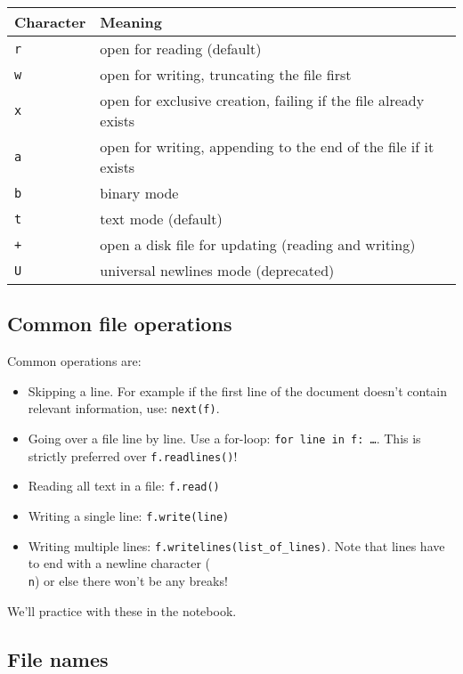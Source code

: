 \documentclass[12pt]{book}
\begin{document}
\begin{table}[h]
\begin{tabular}{ll}
\toprule
Character & Meaning\\
\midrule
\texttt{r} & open for reading (default)\\
\texttt{w} & open for writing, truncating the file first\\
\texttt{x} & open for exclusive creation, failing if the file already
exists\\
\texttt{a} & open for writing, appending to the end of the file if it
exists\\
\texttt{b} & binary mode\\
\texttt{t} & text mode (default)\\
\texttt{+} & open a disk file for updating (reading and writing)\\
\texttt{U} & universal newlines mode (deprecated)\\
\bottomrule
\end{tabular}
\end{table}

\subsection{Common file operations}
Common operations are:

\begin{itemize}
\item Skipping a line. For example if the first line of the document doesn't
  contain relevant information, use: \texttt{next(f)}.
\item Going over a file line by line. Use a for-loop: \texttt{for line in f: \ldots}. This is strictly preferred over \texttt{f.readlines()}!
\item Reading all text in a file: \texttt{f.read()}
\item Writing a single line: \texttt{f.write(line)}
\item Writing multiple lines: \texttt{f.writelines(list\_of\_lines)}. Note that lines have to end with a newline character
  (\texttt{\\n}) or else there won't be any breaks!
\end{itemize}

We'll practice with these in the notebook.

\subsection{File names}
\end{document}
